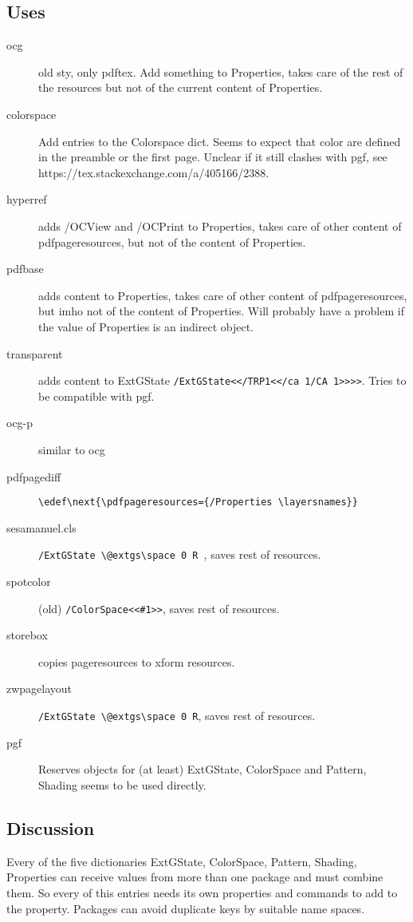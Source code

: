 \documentclass{article}
\begin{document}
\subsection{Uses}
\begin{description}
  \item[ocg] old sty, only pdftex. Add something to Properties, takes care of the rest of the resources but not of the current content of Properties.
  \item[colorspace] Add entries to the Colorspace dict. Seems to expect that color are defined in the preamble or the first page. Unclear if it still clashes with pgf, see https://tex.stackexchange.com/a/405166/2388.
  \item[hyperref] adds /OCView and /OCPrint to Properties, takes care of other content of pdfpageresources, but not of the content of Properties.
  \item[pdfbase] adds content to Properties, takes care of other content of pdfpageresources, but imho not of the content of Properties. Will probably have a problem if the value of Properties is an indirect object.
  \item[transparent] adds content to ExtGState \verb+/ExtGState<</TRP1<</ca 1/CA 1>>>>+. Tries to be compatible with pgf.
  \item[ocg-p] similar to ocg
  \item[pdfpagediff] \verb+\edef\next{\pdfpageresources={/Properties \layersnames}}+
  \item[sesamanuel.cls] \verb+/ExtGState \@extgs\space 0 R +, saves rest of resources.
  \item[spotcolor] (old) \verb+/ColorSpace<<#1>>+, saves rest of resources.
  \item[storebox] copies pageresources to xform resources.
  \item[zwpagelayout] \verb+/ExtGState \@extgs\space 0 R+, saves rest of resources.
  \item[pgf] Reserves objects for (at least) ExtGState, ColorSpace and Pattern, Shading seems to be used directly.
\end{description}

\subsection{Discussion}
Every of the five dictionaries ExtGState, ColorSpace, Pattern, Shading, Properties can receive values from more than one package and must combine them. So every of this entries needs its own properties and commands to add to the property. Packages can avoid duplicate keys by suitable name spaces.
\end{document}
